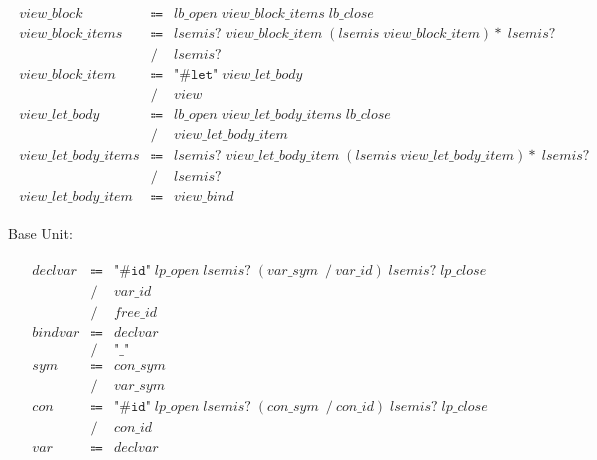 \begin{align*}
    \begin{array}{rcll}
        \mathit{view\_block}
        &\Coloneq &\mathit{lb\_open}\; \mathit{view\_block\_items}\; \mathit{lb\_close} \\
        \mathit{view\_block\_items}
        &\Coloneq &\mathit{lsemis}{?}\; \mathit{view\_block\_item}\; (\mathit{lsemis}\; \mathit{view\_block\_item}){*}\; \mathit{lsemis}{?} \\
        &\mathrel{/} &\mathit{lsemis}{?} \\
        \mathit{view\_block\_item}
        &\Coloneq &\texttt{"\#let"}\; \mathit{view\_let\_body} \\
        &\mathrel{/} &\mathit{view} \\
        \mathit{view\_let\_body}
        &\Coloneq &\mathit{lb\_open}\; \mathit{view\_let\_body\_items}\; \mathit{lb\_close} \\
        &\mathrel{/} &\mathit{view\_let\_body\_item} \\
        \mathit{view\_let\_body\_items}
        &\Coloneq &\mathit{lsemis}{?}\; \mathit{view\_let\_body\_item}\; (\mathit{lsemis}\; \mathit{view\_let\_body\_item}){*}\; \mathit{lsemis}{?} \\
        &\mathrel{/} &\mathit{lsemis}{?} \\
        \mathit{view\_let\_body\_item}
        &\Coloneq &\mathit{view\_bind}
    \end{array}
\end{align*}

Base Unit:

\begin{align*}
    \begin{array}{rcll}
        \mathit{declvar}
        &\Coloneq &\texttt{"\#id"}\; \mathit{lp\_open}\; \mathit{lsemis}{?}\; (\mathit{var\_sym}\; \mathrel{/} \mathit{var\_id})\; \mathit{lsemis}{?}\; \mathit{lp\_close} \\
        &\mathrel{/} &\mathit{var\_id} \\
        &\mathrel{/} &\mathit{free\_id} \\
        \mathit{bindvar}
        &\Coloneq &\mathit{declvar} \\
        &\mathrel{/} &\texttt{"\_"} \\
        \mathit{sym}
        &\Coloneq &\mathit{con\_sym} \\
        &\mathrel{/} &\mathit{var\_sym} \\
        \mathit{con}
        &\Coloneq &\texttt{"\#id"}\; \mathit{lp\_open}\; \mathit{lsemis}{?}\; (\mathit{con\_sym}\; \mathrel{/} \mathit{con\_id})\; \mathit{lsemis}{?}\; \mathit{lp\_close} \\
        &\mathrel{/} &\mathit{con\_id} \\
        \mathit{var}
        &\Coloneq &\mathit{declvar}
    \end{array}
\end{align*}

